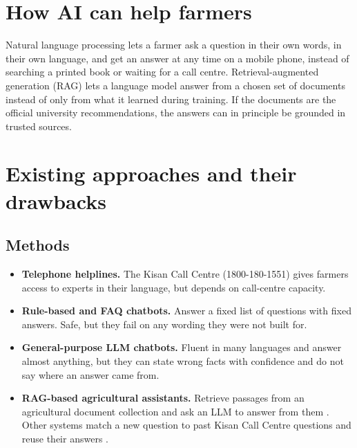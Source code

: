 \section{How AI can help farmers}
Natural language processing lets a farmer ask a question in their own words, in their own
language, and get an answer at any time on a mobile phone, instead of searching a printed
book or waiting for a call centre. Retrieval-augmented generation (RAG) lets a language
model answer from a chosen set of documents instead of only from what it learned during
training. If the documents are the official university recommendations, the answers can
in principle be grounded in trusted sources.

\section{Existing approaches and their drawbacks}
\subsection{Methods}
\begin{itemize}
  \item \textbf{Telephone helplines.} The Kisan Call Centre (1800-180-1551) gives
    farmers access to experts in their language, but depends on call-centre capacity.
  \item \textbf{Rule-based and FAQ chatbots.} Answer a fixed list of questions with
    fixed answers. Safe, but they fail on any wording they were not built for.
  \item \textbf{General-purpose LLM chatbots.} Fluent in many languages and answer almost
    anything, but they can state wrong facts with confidence and do not say where an
    answer came from.
  \item \textbf{RAG-based agricultural assistants.} Retrieve passages from an agricultural
    document collection and ask an LLM to answer from them
    \cite{vijayvargia2025krishisathi,singh2024farmerchat,samuel2025agrollm,sawant2026empowering}.
    Other systems match a new question to past Kisan Call Centre questions and reuse their
    answers \cite{rehman2024kisanqrs,jain2025agribot}.
\end{itemize}


